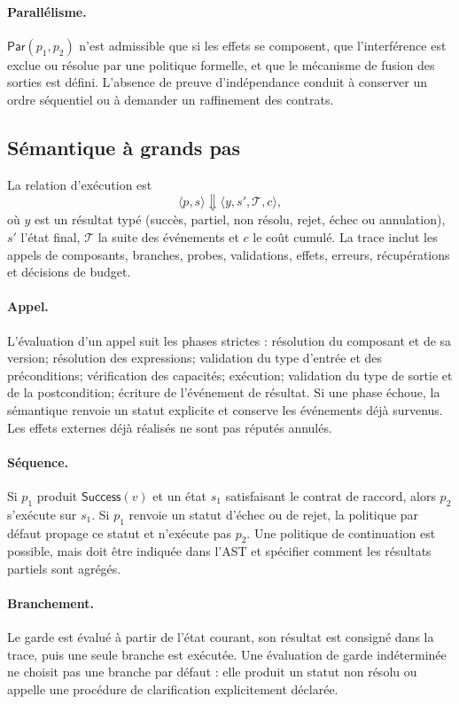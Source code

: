 \documentclass[11pt,a4paper]{article}
\newcommand{\trace}{\mathcal{T}}
\theoremstyle{definition}
\theoremstyle{plain}
\theoremstyle{remark}
\begin{document}
\paragraph{Parallélisme.} $\mathsf{Par}(p_1,p_2)$ n'est admissible que si les effets se composent, que l'interférence est exclue ou résolue par une politique formelle, et que le mécanisme de fusion des sorties est défini. L'absence de preuve d'indépendance conduit à conserver un ordre séquentiel ou à demander un raffinement des contrats.

\subsection{Sémantique à grands pas}
La relation d'exécution est
\[
\langle p,s\rangle\Downarrow\langle y,s',\trace,c\rangle,
\]
où $y$ est un résultat typé (succès, partiel, non résolu, rejet, échec ou annulation), $s'$ l'état final, $\trace$ la suite des événements et $c$ le coût cumulé. La trace inclut les appels de composants, branches, probes, validations, effets, erreurs, récupérations et décisions de budget.

\paragraph{Appel.} L'évaluation d'un appel suit les phases strictes : résolution du composant et de sa version; résolution des expressions; validation du type d'entrée et des préconditions; vérification des capacités; exécution; validation du type de sortie et de la postcondition; écriture de l'événement de résultat. Si une phase échoue, la sémantique renvoie un statut explicite et conserve les événements déjà survenus. Les effets externes déjà réalisés ne sont pas réputés annulés.

\paragraph{Séquence.} Si $p_1$ produit $\mathsf{Success}(v)$ et un état $s_1$ satisfaisant le contrat de raccord, alors $p_2$ s'exécute sur $s_1$. Si $p_1$ renvoie un statut d'échec ou de rejet, la politique par défaut propage ce statut et n'exécute pas $p_2$. Une politique de continuation est possible, mais doit être indiquée dans l'AST et spécifier comment les résultats partiels sont agrégés.

\paragraph{Branchement.} Le garde est évalué à partir de l'état courant, son résultat est consigné dans la trace, puis une seule branche est exécutée. Une évaluation de garde indéterminée ne choisit pas une branche par défaut : elle produit un statut non résolu ou appelle une procédure de clarification explicitement déclarée.
\end{document}
